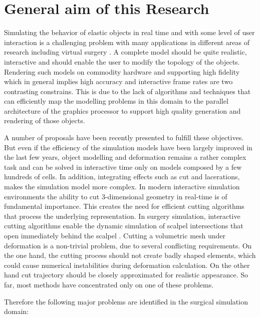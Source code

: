 

\label{chapter:introduction}
\section{General aim of this Research}
Simulating the behavior of elastic objects in real time and with some level of user interaction is a challenging problem 
with many applications in different areas of research including virtual surgery \cite{Meier2005}. 
A complete model should be quite realistic, interactive and should enable the user to modify the topology of the objects.
Rendering such models on commodity hardware and supporting high fidelity which in general implies high 
accuracy and interactive frame rates are two contrasting constrains. This is due 
to the lack of algorithms and techniques that can efficiently map the modelling problems in this domain to the 
parallel architecture of the graphics processor to support high quality generation and rendering of those objects. 

A number of proposals have been recently presented to fulfill these objectives. But even if the efficiency
of the simulation models have been largely improved in the last few years, object modelling and deformation remains a rather 
complex task and can be solved in interactive time only on models composed by a few hundreds of cells. In addition, integrating effects
such as cut and lacerations, makes the simulation model more complex. In modern interactive simulation environments the ability to 
cut 3-dimensional geometry in real-time is of fundamental importance. This creates the need for efficient cutting algorithms that process the 
underlying representation. In surgery simulation, interactive cutting algorithms enable the dynamic simulation of scalpel intersections that open 
immediately behind the scalpel \cite{Nienhuys2001a}. Cutting a volumetric mesh under deformation is a non-trivial problem, due to several conflicting
requirements. On the one hand, the cutting process should not create badly shaped elements, which could cause numerical instabilities during deformation
calculation. On the other hand cut trajectory should be closely approximated for realistic appearance. So far, most methods have concentrated only on 
one of these problems. 

Therefore the following major problems are identified in the surgical simulation domain:

